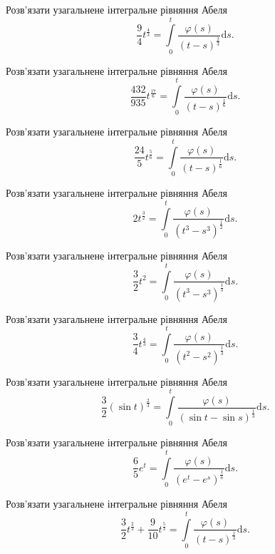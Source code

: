 \documentclass[12pt]{extarticle}
\begin{document}
\begin{Exercise}
Розв’язати узагальнене інтегральне рівняння Абеля \[\dfrac{9}{4} t^{\frac{4}{3}} = \int\limits_{0}^{t} \dfrac{\varphi(s)}{(t-s)^{\frac{2}{3}}} \mathrm{d}s.\]
\end{Exercise}

\begin{Exercise}
Розв’язати узагальнене інтегральне рівняння Абеля \[\dfrac{432}{935} t^{\frac{17}{6}} = \int\limits_{0}^{t} \dfrac{\varphi(s)}{(t-s)^{\frac{1}{6}}} \mathrm{d}s.\]
\end{Exercise}

\begin{Exercise}
Розв’язати узагальнене інтегральне рівняння Абеля \[\dfrac{24}{5} t^{\frac{5}{6}} = \int\limits_{0}^{t} \dfrac{\varphi(s)}{(t-s)^{\frac{1}{6}}} \mathrm{d}s.\]
\end{Exercise}

\begin{Exercise}
Розв’язати узагальнене інтегральне рівняння Абеля \[2 t^{\frac{3}{2}} = \int\limits_{0}^{t} \dfrac{\varphi(s)}{(t^3-s^3)^{\frac{1}{2}}} \mathrm{d}s.\]
\end{Exercise}

\begin{Exercise}
Розв’язати узагальнене інтегральне рівняння Абеля \[\dfrac{3}{2} t^2 = \int\limits_{0}^{t} \dfrac{\varphi(s)}{(t^3-s^3)^{\frac{1}{3}}} \mathrm{d}s.\]
\end{Exercise}

\begin{Exercise}
Розв’язати узагальнене інтегральне рівняння Абеля \[\dfrac{3}{4} t^{\frac{4}{3}} = \int\limits_{0}^{t} \dfrac{\varphi(s)}{(t^2-s^2)^{\frac{1}{3}}} \mathrm{d}s.\]
\end{Exercise}

\begin{Exercise}
Розв’язати узагальнене інтегральне рівняння Абеля \[\dfrac{3}{2} (\sin t)^{\frac{2}{3}} = \int\limits_{0}^{t} \dfrac{\varphi(s)}{(\sin t- \sin s)^{\frac{1}{3}}} \mathrm{d}s.\]
\end{Exercise}

\begin{Exercise}
Розв’язати узагальнене інтегральне рівняння Абеля \[\dfrac{6}{5} e^t = \int\limits_{0}^{t} \dfrac{\varphi(s)}{\left(e^t-e^s\right)^{\frac{1}{6}}} \mathrm{d}s.\]
\end{Exercise}

\begin{Exercise}
Розв’язати узагальнене інтегральне рівняння Абеля \[\dfrac{3}{2} t^{\frac{2}{3}} + \dfrac{9}{10} t^{\frac{5}{3}} = \int\limits_{0}^{t} \dfrac{\varphi(s)}{(t-s)^{\frac{1}{3}}} \mathrm{d}s.\]
\end{Exercise}
\end{document}
